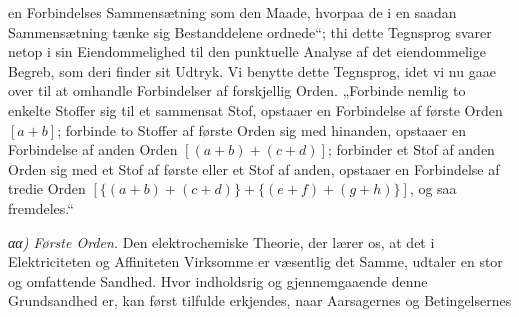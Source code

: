 \documentclass[12pt,a4paper]{book}
\begin{document}
en Forbindelses Sammensætning som den Maade, hvorpaa de i en saadan
Sammensætning tænke sig Bestanddelene ordnede“; thi dette Tegnsprog
svarer netop i sin Eiendommelighed til den punktuelle Analyse af
det eiendommelige Begreb, som deri finder sit Udtryk. Vi benytte
dette Tegnsprog, idet vi nu gaae over til at omhandle Forbindelser
af forskjellig Orden. „Forbinde nemlig to enkelte Stoffer sig til
et sammensat Stof, opstaaer en Forbindelse af første Orden
$[a + b]$; forbinde to Stoffer af første Orden sig med hinanden,
opstaaer en Forbindelse af anden Orden $[(a + b) + (c + d)]$;
forbinder et Stof af anden Orden sig med et Stof af første eller et
Stof af anden, opstaaer en Forbindelse af tredie Orden
$[\{(a + b) + (c + d)\} + \{(e + f) + (g + h)\}]$, og saa
fremdeles.“

\emph{αα) Første Orden.} Den elektrochemiske Theorie, der lærer
os, at det i Elektriciteten og Affiniteten Virksomme er væsentlig
det Samme, udtaler en stor og omfattende Sandhed. Hvor indholdsrig
og gjennemgaaende denne Grundsandhed er, kan først tilfulde
erkjendes, naar Aarsagernes og Betingelsernes
\end{document}
